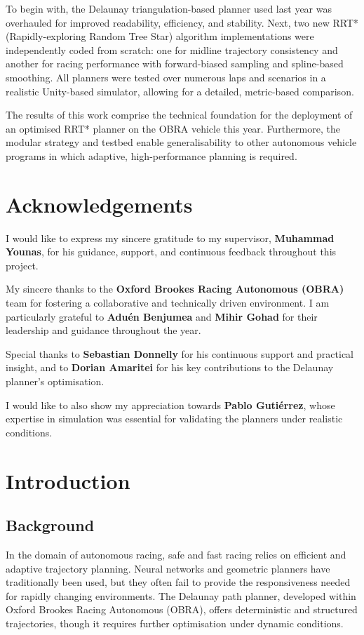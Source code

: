 \documentclass[a4paper,11pt]{report}
\begin{document}
To begin with, the Delaunay triangulation-based planner used last year was overhauled for improved 
readability, efficiency, and stability. Next, two new RRT* (Rapidly-exploring Random Tree Star) algorithm 
implementations were independently coded from scratch: one for midline trajectory consistency and another for racing 
performance with forward-biased sampling and spline-based smoothing. All planners were tested over numerous laps and scenarios 
in a realistic Unity-based simulator, allowing for a detailed, metric-based comparison.

The results of this work comprise the technical foundation for the deployment of an optimised RRT* 
planner on the OBRA vehicle this year. Furthermore, the modular strategy and testbed enable generalisability 
to other autonomous vehicle programs in which adaptive, high-performance planning is required.

\chapter*{Acknowledgements}

I would like to express my sincere gratitude to my supervisor, \textbf{Muhammad Younas}, 
for his guidance, support, and continuous feedback throughout this project. 

My sincere thanks to the \textbf{Oxford Brookes Racing Autonomous (OBRA)} team for fostering a 
collaborative and technically driven environment. I am particularly grateful to \textbf{Aduén Benjumea} and 
\textbf{Mihir Gohad} for their leadership and guidance throughout the year.

Special thanks to \textbf{Sebastian Donnelly} for his continuous support and practical insight, 
and to \textbf{Dorian Amaritei} for his key contributions to the Delaunay planner’s optimisation.

I would like to also show my appreciation towards \textbf{Pablo Gutiérrez}, whose expertise in simulation was essential for validating the planners under realistic conditions.

\newpage
\chapter{Introduction}
\section{Background}
In the domain of autonomous racing, safe and fast racing relies on efficient and adaptive trajectory planning. 
Neural networks and geometric planners have traditionally been used, but they often fail to provide the responsiveness needed for rapidly changing environments.
The Delaunay path planner, developed within Oxford Brookes Racing Autonomous (OBRA), offers deterministic and structured trajectories, though it requires further optimisation under dynamic conditions.
\end{document}
